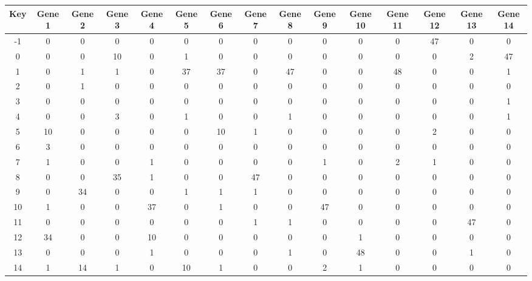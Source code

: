 \begin{tabular}{|c|c|c|c|c|c|c|c|c|c|c|c|c|c|c|}
\hline
Key & Gene 1 & Gene 2 & Gene 3 & Gene 4 & Gene 5 & Gene 6 & Gene 7 & Gene 8 & Gene 9 & Gene 10 & Gene 11 & Gene 12 & Gene 13 & Gene 14 \\
\hline
-1 & 0 & 0 & 0 & 0 & 0 & 0 & 0 & 0 & 0 & 0 & 0 & 47 & 0 & 0 \\
0 & 0 & 0 & 10 & 0 & 1 & 0 & 0 & 0 & 0 & 0 & 0 & 0 & 2 & 47 \\
1 & 0 & 1 & 1 & 0 & 37 & 37 & 0 & 47 & 0 & 0 & 48 & 0 & 0 & 1 \\
2 & 0 & 1 & 0 & 0 & 0 & 0 & 0 & 0 & 0 & 0 & 0 & 0 & 0 & 0 \\
3 & 0 & 0 & 0 & 0 & 0 & 0 & 0 & 0 & 0 & 0 & 0 & 0 & 0 & 1 \\
4 & 0 & 0 & 3 & 0 & 1 & 0 & 0 & 1 & 0 & 0 & 0 & 0 & 0 & 1 \\
5 & 10 & 0 & 0 & 0 & 0 & 10 & 1 & 0 & 0 & 0 & 0 & 2 & 0 & 0 \\
6 & 3 & 0 & 0 & 0 & 0 & 0 & 0 & 0 & 0 & 0 & 0 & 0 & 0 & 0 \\
7 & 1 & 0 & 0 & 1 & 0 & 0 & 0 & 0 & 1 & 0 & 2 & 1 & 0 & 0 \\
8 & 0 & 0 & 35 & 1 & 0 & 0 & 47 & 0 & 0 & 0 & 0 & 0 & 0 & 0 \\
9 & 0 & 34 & 0 & 0 & 1 & 1 & 1 & 0 & 0 & 0 & 0 & 0 & 0 & 0 \\
10 & 1 & 0 & 0 & 37 & 0 & 1 & 0 & 0 & 47 & 0 & 0 & 0 & 0 & 0 \\
11 & 0 & 0 & 0 & 0 & 0 & 0 & 1 & 1 & 0 & 0 & 0 & 0 & 47 & 0 \\
12 & 34 & 0 & 0 & 10 & 0 & 0 & 0 & 0 & 0 & 1 & 0 & 0 & 0 & 0 \\
13 & 0 & 0 & 0 & 1 & 0 & 0 & 0 & 1 & 0 & 48 & 0 & 0 & 1 & 0 \\
14 & 1 & 14 & 1 & 0 & 10 & 1 & 0 & 0 & 2 & 1 & 0 & 0 & 0 & 0 \\
\hline
\end{tabular}